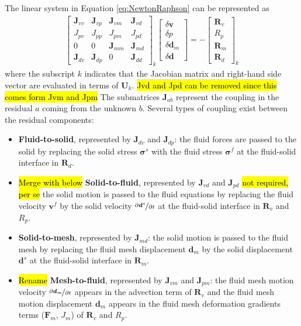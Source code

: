 \documentclass[sn-mathphys,Numbered]{sn-jnl}%
\newcommand{\bb}{\boldsymbol}
\begin{document}
The linear system in Equation \ref{eq:NewtonRaphson} can be represented as
\begin{eqnarray} \label{eqn:jacobian}
\begin{bmatrix}
\bb{J}_{vv} & \bb{J}_{vp} & \bb{J}_{vm} & \bb{J}_{vd} \\
J_{pv} & J_{pp} & J_{pm} & J_{pd} \\
0 & 0 & \bb{J}_{mm} & \bb{J}_{md} \\
\bb{J}_{dv} & \bb{J}_{dp} & 0 & \bb{J}_{dd}
\end{bmatrix}_k
\begin{bmatrix}
\delta \bb{v} \\
\delta p \\
\delta \bb{d}_m \\
\delta \bb{d}
\end{bmatrix}
=
-
\begin{bmatrix}
\bb{R}_v  \\
R_p \\
\bb{R}_m \\
\bb{R}_d
\end{bmatrix}_k
\end{eqnarray}
where the subscript $k$ indicates that the Jacobian matrix and right-hand side vector are evaluated in terms of $\bb{U}_k$.
\hl{Jvd and Jpd can be removed since this comes form Jvm and Jpm}
The submatrices $\bb{J}_{ab}$ represent the coupling in the residual $a$ coming from the unknown $b$.
Several types of coupling exist between the residual components:
\begin{itemize}
	\item \textbf{Fluid-to-solid}, represented by $\bb{J}_{dv}$ and $\bb{J}_{dp}$:
	the fluid forces are passed to the solid by replacing the solid stress $\bb{\sigma}^s$ with the fluid stress $\bb{\sigma}^f$ at the fluid-solid interface in $\bb{R}_d$.
	\item \hl{Merge with below}  \textbf{Solid-to-fluid}, represented by $\bb{J}_{vd}$ and $\bb{J}_{pd}$ \hl{not required, per se}
	the solid motion is passed to the fluid equations by replacing the fluid velocity $\bb{v}^f$ by the solid velocity $\nicefrac{\partial \bb{d}^s}{\partial t}$ at the fluid-solid interface in $\bb{R}_v$ and $R_p$.
	\item \textbf{Solid-to-mesh}, represented by $\bb{J}_{md}$:
	the solid motion is passed to the fluid mesh by replacing the fluid mesh displacement $\bb{d}_m$ by the solid displacement $\bb{d}^s$ at the fluid-solid interface in $\bb{R}_m$. 
	\item \hl{Rename} \textbf{Mesh-to-fluid}, represented by $\bb{J}_{vm}$ and $\bb{J}_{pm}$:
	the fluid mesh motion velocity $\nicefrac{\partial \bb{d}_m}{\partial t}$ appears in the advection term of $\bb{R}_v$ and the fluid mesh motion displacement $\bb{d}_m$ appears in the fluid mesh deformation gradients terms ($\bb{F}_m$, $J_m$) of $\bb{R}_v$ and $R_p$.
\end{itemize}
\end{document}
